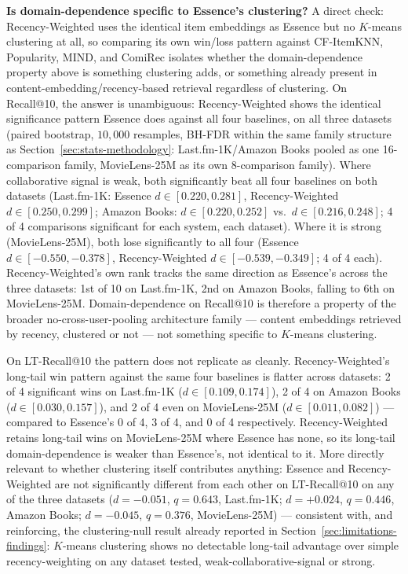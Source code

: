 \documentclass[11pt,a4paper]{article}
\begin{document}
\textbf{Is domain-dependence specific to Essence's clustering?} A direct
check: Recency-Weighted uses the identical item embeddings as Essence but
no $K$-means clustering at all, so comparing its own win/loss pattern
against CF-ItemKNN, Popularity, MIND, and ComiRec isolates whether the
domain-dependence property above is something clustering adds, or
something already present in content-embedding/recency-based retrieval
regardless of clustering. On Recall@10, the answer is unambiguous:
Recency-Weighted shows the identical significance pattern Essence does
against all four baselines, on all three datasets (paired bootstrap,
$10{,}000$ resamples, BH-FDR within the same family structure as
Section~\ref{sec:stats-methodology}: Last.fm-1K/Amazon Books pooled as one
16-comparison family, MovieLens-25M as its own 8-comparison family).
Where collaborative signal is weak, both significantly beat all four
baselines on both datasets (Last.fm-1K: Essence $d\in[0.220,0.281]$,
Recency-Weighted $d\in[0.250,0.299]$; Amazon Books: $d\in[0.220,0.252]$
vs.\ $d\in[0.216,0.248]$; 4 of 4 comparisons significant for each system,
each dataset). Where it is strong (MovieLens-25M), both lose significantly
to all four (Essence $d\in[-0.550,-0.378]$, Recency-Weighted
$d\in[-0.539,-0.349]$; 4 of 4 each). Recency-Weighted's own rank tracks
the same direction as Essence's across the three datasets: 1st of 10 on
Last.fm-1K, 2nd on Amazon Books, falling to 6th on MovieLens-25M.
Domain-dependence on Recall@10 is therefore a property of the broader
no-cross-user-pooling architecture family --- content embeddings retrieved
by recency, clustered or not --- not something specific to $K$-means
clustering.

On LT-Recall@10 the pattern does not replicate as cleanly.
Recency-Weighted's long-tail win pattern against the same four baselines
is flatter across datasets: 2 of 4 significant wins on Last.fm-1K
($d\in[0.109,0.174]$), 2 of 4 on Amazon Books ($d\in[0.030,0.157]$), and 2
of 4 even on MovieLens-25M ($d\in[0.011,0.082]$) --- compared to Essence's
0 of 4, 3 of 4, and 0 of 4 respectively. Recency-Weighted retains
long-tail wins on MovieLens-25M where Essence has none, so its long-tail
domain-dependence is weaker than Essence's, not identical to it. More
directly relevant to whether clustering itself contributes anything:
Essence and Recency-Weighted are not significantly different from each
other on LT-Recall@10 on any of the three datasets ($d=-0.051$,
$q=0.643$, Last.fm-1K; $d=+0.024$, $q=0.446$, Amazon Books; $d=-0.045$,
$q=0.376$, MovieLens-25M) --- consistent with, and reinforcing, the
clustering-null result already reported in
Section~\ref{sec:limitations-findings}: $K$-means clustering shows no
detectable long-tail advantage over simple recency-weighting on any
dataset tested, weak-collaborative-signal or strong.
\end{document}
